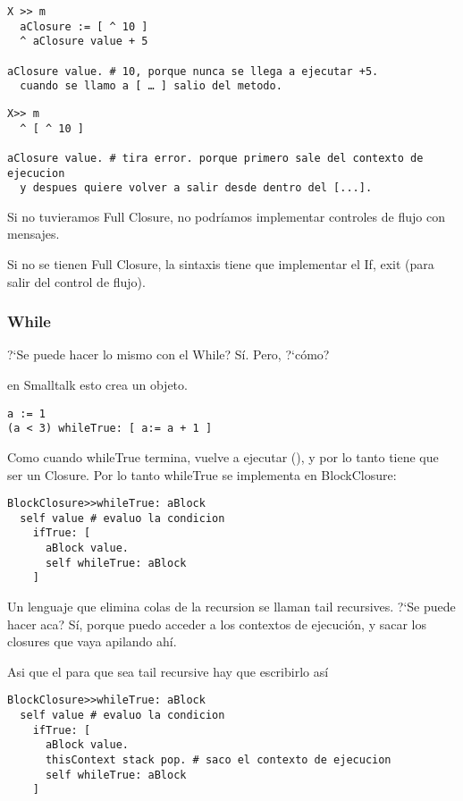 \begin{verbatim}
X >> m
  aClosure := [ ^ 10 ]
  ^ aClosure value + 5

aClosure value. # 10, porque nunca se llega a ejecutar +5. 
  cuando se llamo a [ … ] salio del metodo. 
\end{verbatim}

\begin{verbatim}
X>> m 
  ^ [ ^ 10 ]

aClosure value. # tira error. porque primero sale del contexto de ejecucion 
  y despues quiere volver a salir desde dentro del [...]. 
\end{verbatim}

Si no tuvieramos Full Closure, no podr\'iamos implementar controles de flujo con mensajes. 

Si no se tienen Full Closure, la sintaxis tiene que implementar el If, exit (para salir del control de flujo). 

\subsubsection{While}
?`Se puede hacer lo mismo con el While? S\'i. Pero, ?`c\'omo? 

\code{[...]} en Smalltalk esto crea un objeto. 

\begin{verbatim}
a := 1
(a < 3) whileTrue: [ a:= a + 1 ]
\end{verbatim}

Como cuando whileTrue termina, vuelve a ejecutar (), y por lo tanto tiene que ser un Closure. Por lo tanto whileTrue se implementa en BlockClosure:

\begin{verbatim}
BlockClosure>>whileTrue: aBlock
  self value # evaluo la condicion
    ifTrue: [
      aBlock value.
      self whileTrue: aBlock
    ]
\end{verbatim}

Un lenguaje que elimina colas de la recursion se llaman tail recursives. ?`Se puede hacer aca? S\'i, porque puedo acceder a los contextos de ejecuci\'on, y sacar los closures que vaya apilando ah\'i. 

Asi que el  para que sea tail recursive hay que escribirlo as\'i

\begin{verbatim}
BlockClosure>>whileTrue: aBlock
  self value # evaluo la condicion
    ifTrue: [
      aBlock value.
      thisContext stack pop. # saco el contexto de ejecucion
      self whileTrue: aBlock
    ]
\end{verbatim}


